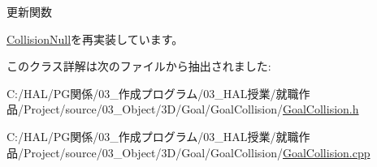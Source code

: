 更新関数 



\mbox{\hyperlink{class_collision_null_a5e5e094e3fbe3ccc0515e485c739bd15}{Collision\+Null}}を再実装しています。



このクラス詳解は次のファイルから抽出されました\+:\begin{DoxyCompactItemize}
\item 
C\+:/\+H\+A\+L/\+P\+G関係/03\+\_\+作成プログラム/03\+\_\+\+H\+A\+L授業/就職作品/\+Project/source/03\+\_\+\+Object/3\+D/\+Goal/\+Goal\+Collision/\mbox{\hyperlink{_goal_collision_8h}{Goal\+Collision.\+h}}\item 
C\+:/\+H\+A\+L/\+P\+G関係/03\+\_\+作成プログラム/03\+\_\+\+H\+A\+L授業/就職作品/\+Project/source/03\+\_\+\+Object/3\+D/\+Goal/\+Goal\+Collision/\mbox{\hyperlink{_goal_collision_8cpp}{Goal\+Collision.\+cpp}}\end{DoxyCompactItemize}
